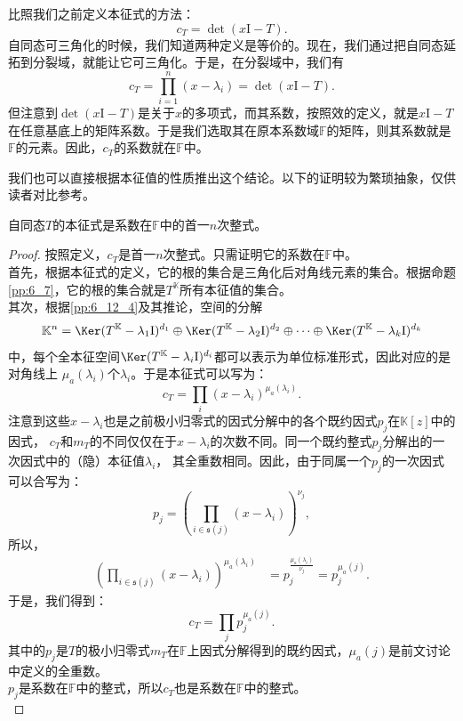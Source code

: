 \documentclass[12pt,UTF8]{ctexbook}
\begin{document}
比照我们之前定义本征式的方法：
$$
c_T = \det(x\mathrm{I} - T).
$$
自同态可三角化的时候，我们知道两种定义是等价的。现在，我们通过把自同态延拓到分裂域，就能让它可三角化。于是，在分裂域中，我们有
$$
c_T = \prod_{i=1}^n (x - \lambda_i) = \det(x\mathrm{I} - T).
$$
但注意到$\det(x\mathrm{I} - T)$是关于$x$的多项式，而其系数，按照效的定义，就是$x\mathrm{I} - T$在任意基底上的矩阵系数。于是我们选取其在原本系数域$\mathbb{F}$的矩阵，则其系数就是$\mathbb{F}$的元素。因此，$c_T$的系数就在$\mathbb{F}$中。

我们也可以直接根据本征值的性质推出这个结论。以下的证明较为繁琐抽象，仅供读者对比参考。
\begin{pp}\label{pp:9_8}
    自同态$T$的本征式是系数在$\mathbb{F}$中的首一$n$次整式。
\end{pp}
\begin{proof} %
    按照定义，$c_T$是首一$n$次整式。只需证明它的系数在$\mathbb{F}$中。\\
    首先，根据本征式的定义，它的根的集合是三角化后对角线元素的集合。根据命题\ref{pp:6_7}，它的根的集合就是$T^{\mathbb{K}}$所有本征值的集合。\\
    其次，根据\ref{pp:6_12_4}及其推论，空间的分解
    $$ \mathbb{K}^n = \Ker (T^{\mathbb{K}} - \lambda_1\mathrm{I})^{d_1} \oplus \Ker (T^{\mathbb{K}} - \lambda_2\mathrm{I})^{d_2} \oplus \cdots \oplus \Ker (T^{\mathbb{K}} - \lambda_k\mathrm{I})^{d_k}$$
    中，每个全本征空间$\Ker (T^{\mathbb{K}} - \lambda_i\mathrm{I})^{d_i}$都可以表示为单位标准形式，因此对应的是对角线上
    $\mu_a(\lambda_i)$个$\lambda_i$。于是本征式可以写为：
    $$c_T = \prod_{i} (x - \lambda_i)^{\mu_a(\lambda_i)}.$$
    注意到这些$x - \lambda_i$也是之前极小归零式的因式分解中的各个既约因式$p_j$在$\mathbb{K}[z]$中的因式，
    $c_T$和$m_T$的不同仅仅在于$x - \lambda_i$的次数不同。同一个既约整式$p_j$分解出的一次因式中的（隐）本征值$\lambda_i$，
    其全重数相同。因此，由于同属一个$p_j$的一次因式可以合写为：
    $$ p_j = \left(\prod_{i\in \mathfrak{s}(j)} (x - \lambda_i)\right)^{\nu_j}, $$
    所以，
    \begin{align*}
        \left(\prod_{i\in \mathfrak{s}(j)} (x - \lambda_i)\right)^{\mu_a(\lambda_i)} &= p_j^{\frac{\mu_a(\lambda_i)}{\nu_j}} = p_j^{\mu_a(j)}. 
    \end{align*}
    于是，我们得到：    
    $$c_T = \prod_{j} p_j^{\mu_a(j)}.$$
    其中的$p_j$是$T$的极小归零式$m_T$在$\mathbb{F}$上因式分解得到的既约因式，$\mu_a(j)$是前文讨论中定义的全重数。\\
    $p_j$是系数在$\mathbb{F}$中的整式，所以$c_T$也是系数在$\mathbb{F}$中的整式。\\
\end{proof}
\end{document}
